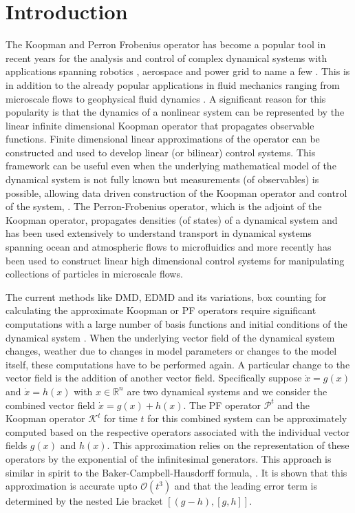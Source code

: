 \documentclass[pdflatex,sn-mathphys]{sn-jnl}%
\renewcommand{\P}{\mathcal{P}}
\newcommand{\K}{\mathcal{K}}
\theoremstyle{thmstyleone}%
\theoremstyle{thmstyletwo}%
\theoremstyle{thmstylethree}%
\begin{document}
\section{Introduction}
The Koopman and Perron Frobenius operator has become a popular tool in recent years for the analysis and control of complex dynamical systems with applications spanning robotics \cite{bruder_RAL_2021, haggerty_science_2023, shi_2024},  aerospace and power grid \cite{korda_ifac_2018} to name a few . This is in addition to the already popular applications in fluid mechanics ranging from microscale flows to geophysical fluid dynamics \cite{froyland_prl_2007, froyland2010transport, rowley_mezic_KMD_2009, mezic_afm_2013}. A significant reason for this popularity is that the dynamics of a nonlinear system can be represented by the linear infinite dimensional Koopman operator that propagates observable functions. Finite dimensional linear approximations of the operator can be constructed and used to develop linear (or bilinear) control systems. This framework can be useful even when the underlying mathematical model of the dynamical system is not fully known but measurements (of observables) is possible, allowing data driven construction of the Koopman operator and control of the system, \cite{korda2018linear,vaidya_cdc_2020, brunton_2021}. The Perron-Frobenius operator, which is the adjoint of the Koopman operator, propagates densities (of states) of a dynamical system and has been used extensively to understand transport in dynamical systems spanning ocean and atmospheric flows to microfluidics and more recently has been used to construct linear high dimensional control systems for manipulating collections of particles in microscale flows.

The current methods like DMD, EDMD and its variations, box counting for calculating the approximate Koopman or PF operators require significant computations with a large number of basis functions and initial conditions of the dynamical system \cite{rowley_mezic_KMD_2009, korda_mezic_2017, brunton22_modernkoopman}. When the underlying vector field of the dynamical system changes, weather due to changes in model parameters or changes to the model itself, these computations have to be performed again. A particular change to the vector field is the addition of another vector field. Specifically suppose $\dot{x} = g(x)$ and $\dot{x}=h(x)$ with $x \in \mathbb{R}^n$ are two dynamical systems and we consider the combined vector field $\dot{x}= g(x) + h(x)$. The PF operator $\P^t$ and the Koopman operator $\K^t$ for time $t$ for this combined system can be approximately computed based on the respective operators associated with the individual vector fields $g(x)$ and $h(x)$.  This approximation relies on the representation of these operators by the exponential of the infinitesimal generators. This approach is similar in spirit to the  Baker-Campbell-Hausdorff formula, \cite{kirillov_2017}. It is shown that this approximation is accurate upto $\mathcal{O}(t^3)$ and that the leading error term is determined by the nested Lie bracket $[(g-h), [g,h]]$.  
\end{document}

